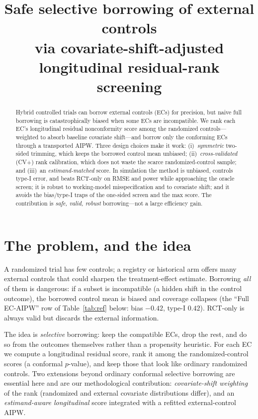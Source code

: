 \documentclass[11pt]{article}
\title{\vspace{-2em}Safe selective borrowing of external controls\\ via covariate-shift-adjusted longitudinal residual-rank screening}
\author{}
\date{}
\begin{document}
\maketitle
\vspace{-3em}

\begin{abstract}
\noindent Hybrid controlled trials can borrow external controls (ECs) for precision, but naive full borrowing is catastrophically biased when some ECs are incompatible. We rank each EC's longitudinal residual nonconformity score among the randomized controls---weighted to absorb baseline covariate shift---and borrow only the conforming ECs through a transported AIPW. Three design choices make it work: (i)~\emph{symmetric} two-sided trimming, which keeps the borrowed control mean unbiased; (ii)~\emph{cross-validated} (CV+) rank calibration, which does not waste the scarce randomized-control sample; and (iii)~an \emph{estimand-matched} score. In simulation the method is unbiased, controls type-I error, and beats RCT-only on RMSE and power while approaching the oracle screen; it is robust to working-model misspecification and to covariate shift; and it avoids the bias/type-I traps of the one-sided screen and the max score. The contribution is \emph{safe, valid, robust} borrowing---not a large efficiency gain.
\end{abstract}

\section{The problem, and the idea}
A randomized trial has few controls; a registry or historical arm offers many external controls that could sharpen the treatment-effect estimate. Borrowing \emph{all} of them is dangerous: if a subset is incompatible (a hidden shift in the control outcome), the borrowed control mean is biased and coverage collapses (the ``Full EC-AIPW'' row of Table~\ref{tab:ref} below: bias $-0.42$, type-I $0.42$). RCT-only is always valid but discards the external information.

The idea is \emph{selective} borrowing: keep the compatible ECs, drop the rest, and do so from the outcomes themselves rather than a propensity heuristic. For each EC we compute a longitudinal residual score, rank it among the randomized-control scores (a conformal $p$-value), and keep those that look like ordinary randomized controls. Two extensions beyond ordinary conformal selective borrowing are essential here and are our methodological contribution: \emph{covariate-shift weighting} of the rank (randomized and external covariate distributions differ), and an \emph{estimand-aware longitudinal} score integrated with a refitted external-control AIPW.
\end{document}
